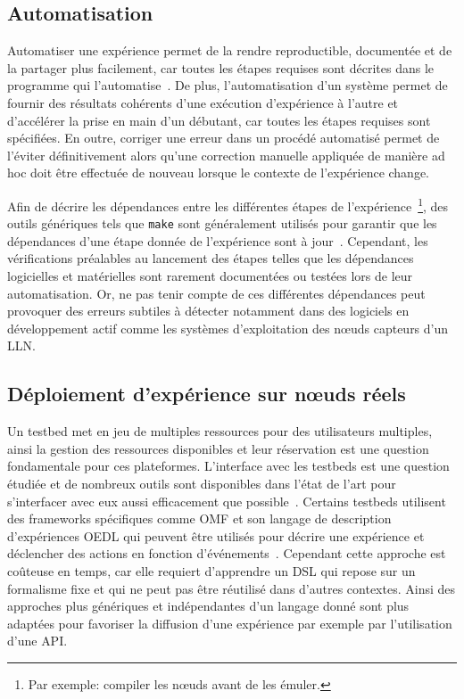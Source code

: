 \subsection{Automatisation}
\label{makesense:related_automatisation}

Automatiser une expérience permet de la rendre reproductible, documentée et de la partager plus facilement, car toutes les étapes requises sont décrites dans le programme qui l'automatise~\cite{lee1992tools, king2009automation}.
De plus, l'automatisation d'un système permet de fournir des résultats cohérents d'une exécution d'expérience à l'autre et d'accélérer la prise en main d'un débutant, car toutes les étapes requises sont spécifiées.
En outre, corriger une erreur dans un procédé automatisé permet de l'éviter définitivement alors qu'une correction manuelle appliquée de manière ad hoc doit être effectuée de nouveau lorsque le contexte de l'expérience change.

Afin de décrire les dépendances entre les différentes étapes de l'expérience~\footnote{Par exemple: compiler les nœuds avant de les émuler.}, des outils génériques tels que \texttt{make} sont généralement utilisés pour garantir que les dépendances d'une étape donnée de l'expérience sont à jour~\cite{feldman1979make}.
Cependant, les vérifications préalables au lancement des étapes telles que les dépendances logicielles et matérielles sont rarement documentées ou testées lors de leur automatisation.
Or, ne pas tenir compte de ces différentes dépendances peut provoquer des erreurs subtiles à détecter notamment dans des logiciels en développement actif comme les systèmes d'exploitation des nœuds capteurs d'un \ac{LLN}.

\subsection{Déploiement d'expérience sur nœuds réels}

Un testbed met en jeu de multiples ressources pour des utilisateurs multiples, ainsi la gestion des ressources disponibles et leur réservation est une question fondamentale pour ces plateformes.
L'interface avec les testbeds est une question étudiée et de nombreux outils sont disponibles dans l'état de l'art pour s'interfacer avec eux aussi efficacement que possible~\cite{buchert2015survey}. 
Certains testbeds utilisent des frameworks spécifiques comme \ac{OMF} et son langage de description d'expériences \ac{OEDL} qui peuvent être utilisés pour décrire une expérience et déclencher des actions en fonction d’événements~\cite{rakotoarivelo2010omf}.
Cependant cette approche est coûteuse en temps, car elle requiert d'apprendre un \ac{DSL} qui repose sur un formalisme fixe et qui ne peut pas être réutilisé dans d'autres contextes.
Ainsi des approches plus génériques et indépendantes d'un langage donné sont plus adaptées pour favoriser la diffusion d'une expérience par exemple par l'utilisation d'une \ac{API}.

